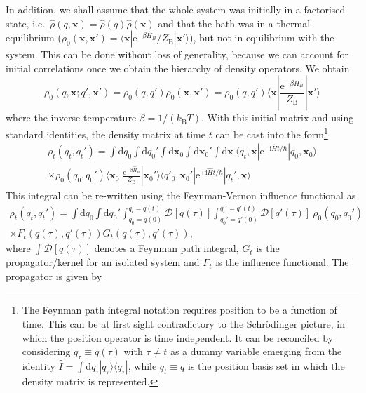 In addition, we shall assume that the whole system was initially in a factorised state, i.e.~$\hat{\rho}(q,\bm{x}) = \hat{\rho}(q)\hat{\rho}(\bm{x})$ and that the bath was in a thermal equilibrium ($\rho_0(\bm{x},\bm{x}') = \langle\bm{x}|\mathrm{e}^{-\beta \hat{H}_B}/Z_\mathrm{B}|\bm{x}'\rangle $), but not in equilibrium with the system. This can be done without loss of generality, because we can account for initial correlations once we obtain the hierarchy of density operators.\supercite{Tanimura1990a} We obtain
\begin{equation}
	\rho_0(q,\bm{x}; q',\bm{x}')
	= \rho_0(q,q')\rho_0(\bm{x},\bm{x}')
	= \rho_0(q,q')\langle\bm{x}|\frac{\mathrm{e}^{-\beta \hat{H}_B}}{Z_\mathrm{B}}|\bm{x}'\rangle
	\label{eq:factorised}
\end{equation}
where the inverse temperature $\beta = 1/(k_\mathrm{B}T)$. With this initial matrix and using standard identities, the density matrix at time $t$ can be cast into the form\footnote[3]{The Feynman path integral notation requires position to be a function of time. This can be at first sight contradictory to the Schr\"odinger picture, in which the position operator is time independent. It can be reconciled by considering $q_\tau \equiv q(\tau)$ with $\tau \neq t$ as a dummy variable emerging from the identity $\hat{I}=\int\mathrm{d}q_\tau |q_\tau\rangle\langle q_\tau|$, while $q_t\equiv q$ is the position basis set in which the density matrix is represented.}
\begin{multline}
	\rho_t(q_t,q_t')=\int\mathrm{d}q_0\int\mathrm{d}q_0'
	\int\mathrm{d}\bm{x}_0
	\int\mathrm{d}\bm{x}_0'
	\int\mathrm{d}\bm{x}\ 
	\langle q_t, \bm{x}|\mathrm{e}^{-\mathrm{i}\hat{H}t/\hbar}|q_0, \bm{x}_0\rangle\\
	\times
	 \rho_0(q_0,q_0')
	 \langle\bm{x}_0|\frac{\mathrm{e}^{-\beta \hat{H}_B}}{Z_\mathrm{B}}|\bm{x}_0'\rangle
	 \langle q'_0, \bm{x}_0'|\mathrm{e}^{+\mathrm{i}\hat{H}t/\hbar}|q_t', \bm{x}\rangle
\end{multline}
This integral can be re-written using the Feynman-Vernon influence functional as\supercite{Feynman1963b}
\begin{multline}
	\rho_t(q_t,q_t')=
	\int\mathrm{d}q_0 
	\int\mathrm{d}q_0'
	\int_{q_0= q(0)}^{q_t = q(t)} \mathcal{D}[q(\tau)]
	\int_{q_0'= q'(0)}^{q_t'= q'(t)} \mathcal{D}[q'(\tau)]
	\ \rho_0(q_0,q_0')
	\\
	\times F_t(q(\tau),q'(\tau))G_t(q(\tau),q'(\tau)),
	\label{eq:rho_t}
\end{multline}
where $\int \mathcal{D}[q(\tau)]$ denotes a Feynman path integral,\supercite{Feynman2010} $G_t$ is the propagator/kernel for an isolated system and $F_t$ is the influence functional. The propagator is given by 

